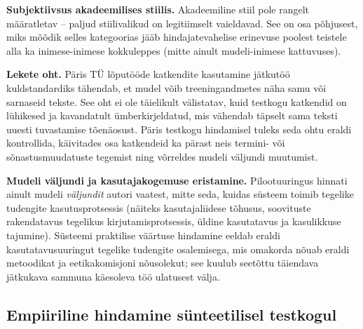 \textbf{Subjektiivsus akadeemilises stiilis.} Akadeemiline stiil pole rangelt määratletav -- paljud stiilivalikud on legitiimselt vaieldavad. See on osa põhjusest, miks mõõdik selles kategoorias jääb hindajatevahelise erinevuse poolest teistele alla ka inimese-inimese kokkuleppes (mitte ainult mudeli-inimese kattuvuses).

\textbf{Lekete oht.} Päris TÜ lõputööde katkendite kasutamine jätkutöö kuldstandardiks tähendab, et mudel võib treeningandmetes näha samu või sarnaseid tekste. See oht ei ole täielikult välistatav, kuid testkogu katkendid on lühikesed ja kavandatult ümberkirjeldatud, mis vähendab täpselt sama teksti uuesti tuvastamise tõenäosust. Päris testkogu hindamisel tuleks seda ohtu eraldi kontrollida, käivitades osa katkendeid ka pärast neis termini- või sõnastusmuudatuste tegemist ning võrreldes mudeli väljundi muutumist.

\textbf{Mudeli väljundi ja kasutajakogemuse eristamine.} Pilootuuringus hinnati ainult mudeli \emph{väljundit} autori vaatest, mitte seda, kuidas süsteem toimib tegelike tudengite kasutusprotsessis (näiteks kasutajaliidese tõhusus, soovituste rakendatavus tegelikus kirjutamisprotsessis, üldine kasutatavus ja kasulikkuse tajumine). Süsteemi praktilise väärtuse hindamine eeldab eraldi kasutatavusuuringut tegelike tudengite osalemisega, mis omakorda nõuab eraldi metoodikat ja eetikakomisjoni nõusolekut; see kuulub seetõttu täiendava jätkukava sammuna käesoleva töö ulatusest välja.

\subsection{Empiiriline hindamine sünteetilisel testkogul} \label{hindamine:synteetiline}

\noindent{}\vspace{6pt}

